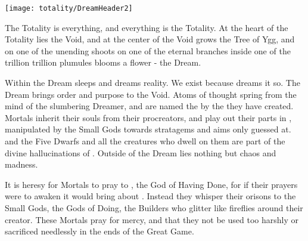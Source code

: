 


\texttt{[image: totality/DreamHeader2]}

    The Totality is everything, and everything is the Totality. At the heart of the Totality lies the Void, and at the center of the Void grows the Tree of Ygg, and on one of the unending shoots on one of the eternal branches inside one of the trillion trillion plumules blooms a flower - the Dream. 

    Within the Dream \TheAuthority sleeps and dreams reality. We exist because \TheAuthority dreams it so. The Dream brings order and purpose to the Void. Atoms of thought spring from the mind of the slumbering Dreamer, and are named the  by the  they have created. Mortals inherit their souls from their procreators, and play out their parts in , manipulated by the Small Gods towards stratagems and aims only guessed at.   and the Five Dwarfs and all the creatures who dwell on them are part of the divine hallucinations of \TheAuthority. Outside of the Dream lies nothing but chaos and madness.

    It is heresy for Mortals to pray to \TheAuthority, the God of Having Done, for if their prayers were to awaken \TheAuthority it would bring about \TheEnd. Instead they whisper their orisons to the Small Gods, the Gods of Doing, the Builders who glitter like fireflies around their creator. These Mortals pray for mercy, and that they not be used too harshly or sacrificed needlessly in the ends of the Great Game.
